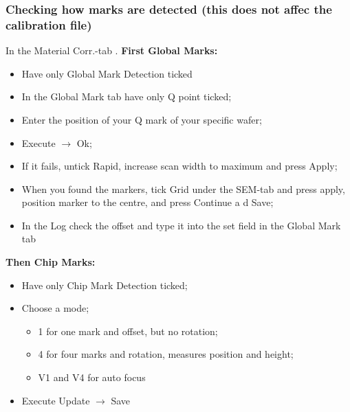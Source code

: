 \subsubsection{Checking how marks are detected (this does not affec the calibration file)}
In the {Material Corr.}-tab \ira {}.  \textbf{First
  Global Marks:}
\begin{itemize}
\item Have only {Global Mark Detection} ticked
\item In the {Global Mark} tab have only Q point ticked;
\item Enter the position of your Q mark of your specific wafer;
\item Execute $\rightarrow$ Ok;
\item If it fails, untick Rapid, increase scan width to maximum and press Apply;
\item When you found  the markers, tick Grid under the  SEM-tab and press apply,
  position marker to the centre, and press Continue a d Save;
\item In the {Log} check the offset and type it into the set field in the Global
  Mark tab
  \begin{framed}\noindent
  \end{framed}
\end{itemize}
\textbf{Then Chip Marks:}
\begin{itemize}
\item Have only {Chip Mark Detection} ticked;
\item Choose a mode;
  \begin{itemize}
  \item 1 for one mark and offset, but no rotation;
  \item 4 for four marks and rotation, measures position and height;
  \item V1 and V4 for auto focus
  \end{itemize}
\item Execute \ira Update $\rightarrow$ Save
\end{itemize}

